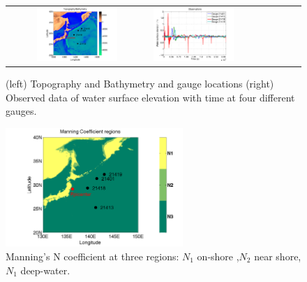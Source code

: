 \begin{figure}[h]
\centering
\begin{tabular}{clc}
\includegraphics[width=0.60\textwidth]{./figures/topo.pdf}  &
\includegraphics[width=0.60\textwidth]{./figures/obs.pdf} 
\label{setup}
\end{tabular}
\caption{(left) Topography and Bathymetry and gauge locations (right)
Observed data of water surface elevation with time at four different gauges.}
\label{fig:setup}
\end{figure}
\begin{figure}[h]      
\centering
\includegraphics[width=0.6\textwidth]{./figures/coef.pdf}
\caption{Manning's N coefficient at three regions: $N_1$ on-shore ,$N_2$ near shore,$N_1$ deep-water.}
\label{fig:ceofs}
\end{figure}  
